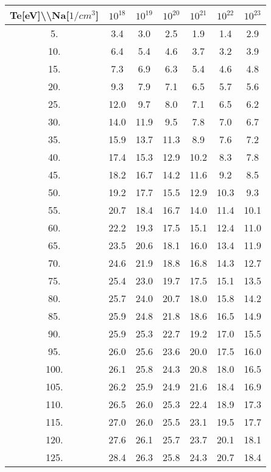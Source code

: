 \begin{tabular}{|c||c|c|c|c|c|c|}
\hline
Te[eV]\textbackslash \textbackslash Na[$1/cm^3$] & $10^{18}$ & $10^{19}$ & $10^{20}$ & $10^{21}$ & $10^{22}$ & $10^{23}$\tabularnewline
\hline
\hline
   5. &     3.4 &     3.0 &     2.5 &     1.9 &     1.4 &     2.9\tabularnewline
\hline
  10. &     6.4 &     5.4 &     4.6 &     3.7 &     3.2 &     3.9\tabularnewline
\hline
  15. &     7.3 &     6.9 &     6.3 &     5.4 &     4.6 &     4.8\tabularnewline
\hline
  20. &     9.3 &     7.9 &     7.1 &     6.5 &     5.7 &     5.6\tabularnewline
\hline
  25. &    12.0 &     9.7 &     8.0 &     7.1 &     6.5 &     6.2\tabularnewline
\hline
  30. &    14.0 &    11.9 &     9.5 &     7.8 &     7.0 &     6.7\tabularnewline
\hline
  35. &    15.9 &    13.7 &    11.3 &     8.9 &     7.6 &     7.2\tabularnewline
\hline
  40. &    17.4 &    15.3 &    12.9 &    10.2 &     8.3 &     7.8\tabularnewline
\hline
  45. &    18.2 &    16.7 &    14.2 &    11.6 &     9.2 &     8.5\tabularnewline
\hline
  50. &    19.2 &    17.7 &    15.5 &    12.9 &    10.3 &     9.3\tabularnewline
\hline
  55. &    20.7 &    18.4 &    16.7 &    14.0 &    11.4 &    10.1\tabularnewline
\hline
  60. &    22.2 &    19.3 &    17.5 &    15.1 &    12.4 &    11.0\tabularnewline
\hline
  65. &    23.5 &    20.6 &    18.1 &    16.0 &    13.4 &    11.9\tabularnewline
\hline
  70. &    24.6 &    21.9 &    18.8 &    16.8 &    14.3 &    12.7\tabularnewline
\hline
  75. &    25.4 &    23.0 &    19.7 &    17.5 &    15.1 &    13.5\tabularnewline
\hline
  80. &    25.7 &    24.0 &    20.7 &    18.0 &    15.8 &    14.2\tabularnewline
\hline
  85. &    25.9 &    24.8 &    21.8 &    18.6 &    16.5 &    14.9\tabularnewline
\hline
  90. &    25.9 &    25.3 &    22.7 &    19.2 &    17.0 &    15.5\tabularnewline
\hline
  95. &    26.0 &    25.6 &    23.6 &    20.0 &    17.5 &    16.0\tabularnewline
\hline
 100. &    26.1 &    25.8 &    24.3 &    20.8 &    18.0 &    16.5\tabularnewline
\hline
 105. &    26.2 &    25.9 &    24.9 &    21.6 &    18.4 &    16.9\tabularnewline
\hline
 110. &    26.5 &    26.0 &    25.3 &    22.4 &    18.9 &    17.3\tabularnewline
\hline
 115. &    27.0 &    26.0 &    25.5 &    23.1 &    19.5 &    17.7\tabularnewline
\hline
 120. &    27.6 &    26.1 &    25.7 &    23.7 &    20.1 &    18.1\tabularnewline
\hline
 125. &    28.4 &    26.3 &    25.8 &    24.3 &    20.7 &    18.4\tabularnewline
\hline
\end{tabular}

